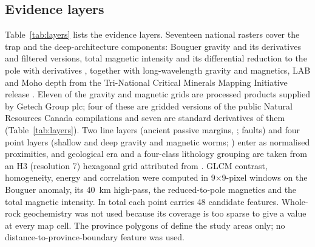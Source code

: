 \documentclass[pdflatex,sn-apa]{sn-jnl}
\begin{document}
\subsection{Evidence layers}\label{sec:layers}

Table~\ref{tab:layers} lists the evidence layers. Seventeen national rasters cover the trap and the deep-architecture components: Bouguer gravity and its derivatives and filtered versions, total magnetic intensity and its differential reduction to the pole with derivatives \citep{Jobin2017,Miles2016}, together with long-wavelength gravity and magnetics, LAB and Moho depth from the Tri-National Critical Minerals Mapping Initiative release \citep{McCafferty2023}. Eleven of the gravity and magnetic grids are processed products supplied by Getech Group plc; four of these are gridded versions of the public Natural Resources Canada compilations and seven are standard derivatives of them (Table~\ref{tab:layers}). Two line layers (ancient passive margins, \citealp{BradleyDC2008}; faults) and four point layers (shallow and deep gravity and magnetic worms; \citealp{McCafferty2023}) enter as normalised proximities, and geological era and a four-class lithology grouping are taken from an H3 (resolution 7) hexagonal grid attributed from \citet{Wheeler1996}. GLCM contrast, homogeneity, energy and correlation were computed in 9$\times$9-pixel windows on the Bouguer anomaly, its 40~km high-pass, the reduced-to-pole magnetics and the total magnetic intensity. In total each point carries 48 candidate features. Whole-rock geochemistry was not used because its coverage is too sparse to give a value at every map cell. The province polygons of \citet{Wheeler1996} define the study areas only; no distance-to-province-boundary feature was used.
\end{document}
